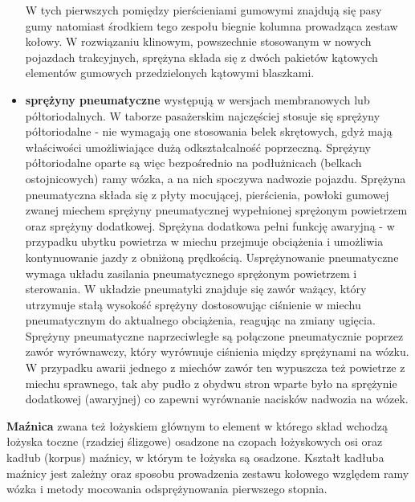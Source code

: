 \begin{itemize}
	W tych pierwszych pomiędzy pierścieniami gumowymi znajdują się pasy gumy natomiast środkiem tego zespołu biegnie kolumna prowadząca zestaw kołowy. W rozwiązaniu klinowym, powszechnie stosowanym w nowych pojazdach trakcyjnych, sprężyna składa się z dwóch pakietów kątowych elementów gumowych przedzielonych kątowymi blaszkami.  
	\item  \textbf{sprężyny pneumatyczne} występują w wersjach membranowych lub półtoriodalnych. 
	W taborze pasażerskim najczęściej stosuje się sprężyny półtoriodalne - nie wymagają one stosowania belek skrętowych, gdyż mają właściwości umożliwiające dużą odkształcalność poprzeczną. Sprężyny półtoriodalne oparte są więc bezpośrednio na podłużnicach (belkach ostojnicowych) ramy wózka, a na nich spoczywa nadwozie pojazdu. Sprężyna pneumatyczna składa się z płyty mocującej, pierścienia, powłoki gumowej zwanej miechem sprężyny pneumatycznej wypełnionej sprężonym powietrzem oraz sprężyny dodatkowej. Sprężyna dodatkowa pełni funkcję awaryjną - w przypadku ubytku powietrza w miechu przejmuje obciążenia i umożliwia kontynuowanie jazdy z obniżoną prędkością. Usprężynowanie pneumatyczne wymaga układu zasilania pneumatycznego sprężonym powietrzem i sterowania. W układzie pneumatyki znajduje się zawór ważący, który utrzymuje stałą wysokość sprężyny dostosowując ciśnienie w miechu pneumatycznym do aktualnego obciążenia, reagując na zmiany ugięcia. 
	Sprężyny pneumatyczne naprzeciwległe są połączone pneumatycznie poprzez zawór wyrównawczy, który wyrównuje ciśnienia między sprężynami na wózku. W przypadku awarii jednego z miechów zawór ten wypuszcza też powietrze z miechu sprawnego, tak aby pudło z obydwu stron wparte było na sprężynie dodatkowej (awaryjnej) co zapewni wyrównanie nacisków nadwozia na wózek. 
	\end{itemize}

\textbf{Maźnica} zwana też łożyskiem głównym to element w którego skład wchodzą łożyska toczne (rzadziej ślizgowe) osadzone na czopach łożyskowych osi oraz kadłub (korpus) maźnicy, w którym te łożyska są osadzone. Kształt kadłuba maźnicy jest zależny oraz sposobu prowadzenia zestawu kołowego względem ramy wózka i metody mocowania odsprężynowania pierwszego stopnia.

